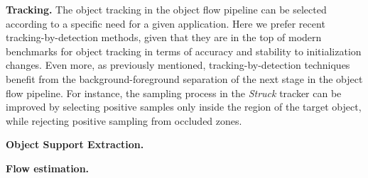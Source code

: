 \textbf{Tracking.} The object tracking in the object flow pipeline can be selected according to a specific need for a given application. Here we prefer recent tracking-by-detection methods,  given that they are in the top of modern benchmarks for object tracking \cite{c16} in terms of accuracy and stability to initialization changes. Even more, as previously mentioned, 
tracking-by-detection techniques benefit from the background-foreground separation of the next stage in the object flow pipeline. For instance, the sampling process in the {\it Struck} 
tracker \cite{c23} can be improved by selecting positive samples only inside the region of the target object, while rejecting positive sampling from occluded zones.


\textbf{Object Support Extraction.} 

\textbf{Flow estimation.} 